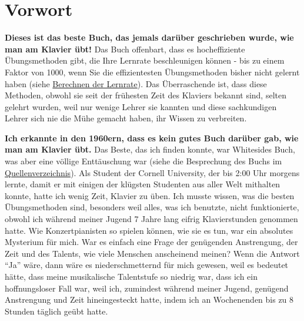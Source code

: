 \chapter*{Vorwort}


\textbf{Dieses ist das beste Buch, das jemals darüber geschrieben wurde, wie man am Klavier übt!}
 Das Buch offenbart, dass es hocheffiziente Übungsmethoden gibt, die Ihre Lernrate beschleunigen können - bis zu einem Faktor von 1000, wenn Sie die effizientesten Übungsmethoden bisher nicht gelernt haben (siehe \hyperlink{c1iv5}{Berechnen der Lernrate}).
 Das Überraschende ist, dass diese Methoden, obwohl sie seit der frühesten Zeit des Klaviers bekannt sind, selten gelehrt wurden, weil nur wenige Lehrer sie kannten und diese sachkundigen Lehrer sich nie die Mühe gemacht haben, ihr Wissen zu verbreiten.
 

\textbf{Ich erkannte in den 1960ern, dass es kein gutes Buch darüber gab, wie man am Klavier übt.}
 Das Beste, das ich finden konnte, war Whitesides Buch, was aber eine völlige Enttäuschung war (siehe die Besprechung des Buchs im \hyperlink{Whiteside}{Quellenverzeichnis}).
 Als Student der Cornell University, der bis 2:00 Uhr morgens lernte, damit er mit einigen der klügsten Studenten aus aller Welt mithalten konnte, hatte ich wenig Zeit, Klavier zu üben.
 Ich musste wissen, was die besten Übungsmethoden sind, besonders weil alles, was ich benutzte, nicht funktionierte, obwohl ich während meiner Jugend 7 Jahre lang eifrig Klavierstunden genommen hatte.
 Wie Konzertpianisten so spielen können, wie sie es tun, war ein absolutes Mysterium für mich.
 War es einfach eine Frage der genügenden Anstrengung, der Zeit und des Talents, wie viele Menschen anscheinend meinen?
 Wenn die Antwort \enquote{Ja} wäre, dann wäre es niederschmetternd für mich gewesen, weil es bedeutet hätte, dass meine musikalische Talentstufe so niedrig war, dass ich ein hoffnungsloser Fall war, weil ich, zumindest während meiner Jugend, genügend Anstrengung und Zeit hineingesteckt hatte, indem ich an Wochenenden bis zu 8 Stunden täglich geübt hatte.
 

